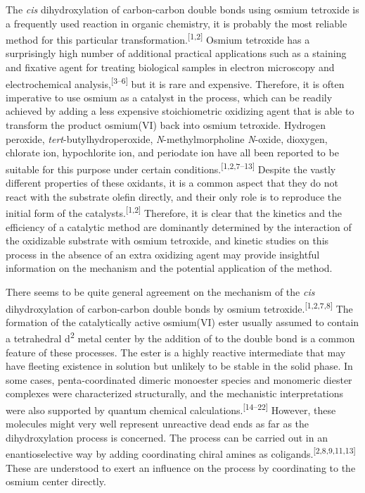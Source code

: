 \documentclass{article}
\begin{document}
The \emph{cis} dihydroxylation of carbon-carbon double bonds using osmium tetroxide is a frequently used reaction in organic chemistry, it is probably the most reliable method for this particular transformation.\textsuperscript{[1,2]} Osmium tetroxide has a surprisingly high number of additional practical applications such as a staining and fixative agent for treating biological samples in electron microscopy and electrochemical analysis,\textsuperscript{[3–6]} but it is rare and expensive. Therefore, it is often imperative to use osmium as a catalyst in the process, which can be readily achieved by adding a less expensive stoichiometric oxidizing agent that is able to transform the product osmium(VI) back into osmium tetroxide. Hydrogen peroxide, \emph{tert}-butylhydroperoxide, \emph{N}-methylmorpholine \emph{N}-oxide, dioxygen, chlorate ion, hypochlorite ion, and periodate ion have all been reported to be suitable for this purpose under certain conditions.\textsuperscript{[1,2,7–13]} Despite the vastly different properties of these oxidants, it is a common aspect that they do not react with the substrate olefin directly, and their only role is to reproduce the initial form of the catalysts.\textsuperscript{[1,2]} Therefore, it is clear that the kinetics and the efficiency of a catalytic method are dominantly determined by the interaction of the oxidizable substrate with osmium tetroxide, and kinetic studies on this process in the absence of an extra oxidizing agent may provide insightful information on the mechanism and the potential application of the method.

There seems to be quite general agreement on the mechanism of the \emph{cis} dihydroxylation of carbon-carbon double bonds by osmium tetroxide.\textsuperscript{[1,2,7,8]} The formation of the catalytically active osmium(VI) ester usually assumed to contain a tetrahedral d\textsuperscript{2} metal center by the addition of  to the double bond is a common feature of these processes. The ester is a highly reactive intermediate that may have fleeting existence in solution but unlikely to be stable in the solid phase. In some cases, penta-coordinated dimeric monoester species  and monomeric diester complexes  were characterized structurally, and the mechanistic interpretations were also supported by quantum chemical calculations.\textsuperscript{[14–22]} However, these molecules might very well represent unreactive dead ends as far as the dihydroxylation process is concerned. The process can be carried out in an enantioselective way by adding coordinating chiral amines as coligands.\textsuperscript{[2,8,9,11,13]} These are understood to exert an influence on the process by coordinating to the osmium center directly.
\end{document}
